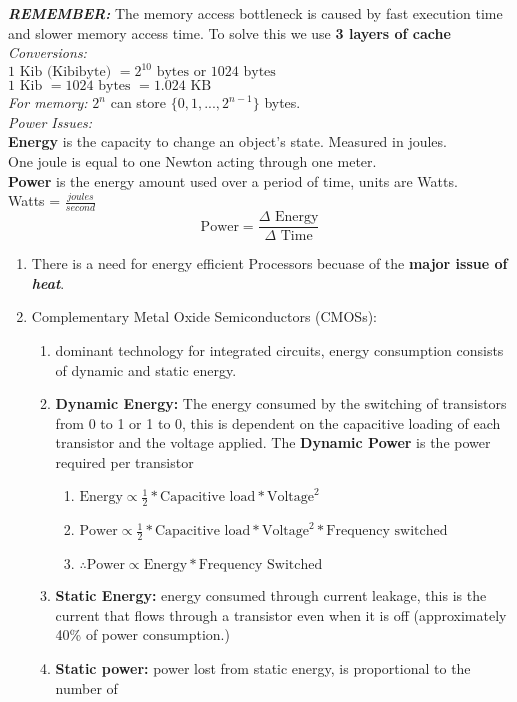 \documentclass{book}
\begin{document}
	\noindent \emph{\textbf{REMEMBER:}} The memory access bottleneck is caused by fast execution time and slower memory access time. To solve this we use \textbf{3 layers of cache}\\

	\noindent \emph{Conversions: } \\
	$ 1 \text{ Kib} \text{ (Kibibyte) } = 2^{10} \text{ bytes or } 1024 \text{ bytes}$ \\
	$ 1 \text{ Kib } = 1024 \text{ bytes } = 1.024 \text{ KB} $ \\
	\emph{For memory: } $2^n$ can store $\{0, 1, ..., 2^{n - 1}\}$ bytes. \\

	\noindent \emph{Power Issues: }\\
	\noindent \textbf{Energy} is the capacity to change an object's state. Measured in joules.\\
	\indent One joule is equal to one Newton acting through one meter.\\
	\noindent \textbf{Power} is the energy amount used over a period of time, units are Watts.\\
		\indent Watts = $\frac{joules}{second}$
		$$ \text{Power} = \frac{\text{$\Delta$ Energy}}{\text{$\Delta$ Time}} $$
	\begin{enumerate}
		\item There is a need for energy efficient Processors becuase of the \textbf{major issue of \emph{heat}}.
		\item Complementary Metal Oxide Semiconductors (CMOSs):
		\begin{enumerate}
			\item dominant technology for integrated circuits, energy consumption consists of dynamic and static energy.
			\item \textbf{Dynamic Energy:} The energy consumed by the switching of transistors from 0 to 1 or 1 to 0, this is dependent on the capacitive loading of each transistor and the voltage applied. The \textbf{Dynamic Power} is the power required per transistor
			\begin{enumerate}
				\item $\text{Energy} \propto \frac{1}{2} * \text{Capacitive load} * \text{Voltage}^2$
				\item $\text{Power} \propto \frac{1}{2} * \text{Capacitive load} * \text{Voltage}^2 * \text{Frequency switched} $
				\item $ \therefore \text{Power} \propto \text{Energy} * \text{Frequency Switched} $
			\end{enumerate}
			\item \textbf{Static Energy:} energy consumed through current leakage, this is the current that flows through a transistor even when it is off (approximately 40\% of power consumption.)
			\item \textbf{Static power:} power lost from static energy, is proportional to the number of \\ \\
		\end{enumerate}
	\end{enumerate} 
\end{document}
